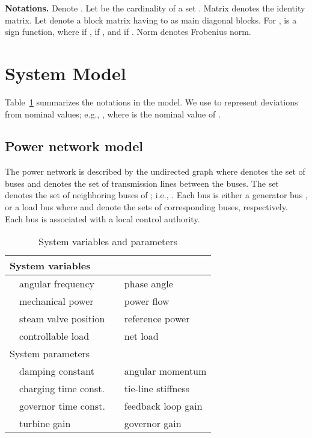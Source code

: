 \documentclass[journal]{IEEEtran}
\begin{document}
\textbf{Notations.}
Denote .
Let  be the cardinality of a set .
Matrix  denotes the  identity matrix. Let  denote a block matrix having  to  as main diagonal blocks. For ,  is a sign function, where  if ,  if , and  if . Norm  denotes Frobenius norm.


\section{System Model}\label{sec:problem-formulation}


Table~\ref{tab:1} summarizes the notations in the model. We use  to represent deviations from nominal values; e.g., , where  is the nominal value of . 

\subsection{Power network model}\label{sec:power-model}
The power network is described by the undirected graph  where  denotes the set of buses and  denotes the set of transmission lines between the buses. The set  denotes the set of neighboring buses of ; i.e., .
Each bus is either a generator bus , or a load bus  where  and  denote the sets of corresponding buses, respectively. Each bus  is associated with a local control authority.
\begin{table}[t]
 \def\arraystretch{1.00} \centering \normalsize
\caption{System variables and parameters}
\begin{tabular}{clcl}
\multicolumn{4}{l}{{System variables}}\\
\hline 
 &  angular frequency &  & phase angle \\
 &  mechanical power &  & power flow \\
 &  steam valve position &   & reference power\\
 &  controllable load&  & net load\\
\multicolumn{4}{l}{{System parameters}}\\
\hline
 &  damping constant &  & angular momentum\\
 & charging time const. &  & tie-line stiffness\\
 & governor time const.  &  & feedback loop gain\\
 & turbine gain &  & governor gain\\ 
\end{tabular}
\vspace{-0.5cm}
\label{tab:1}
\end{table}
\end{document}

